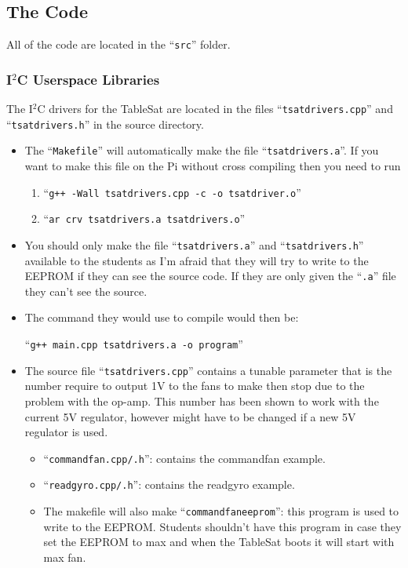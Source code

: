 \documentclass{article}
\begin{document}
\subsection{The Code}
All of the code are located in the ``{\tt src}'' folder.
\subsubsection{I$^2$C Userspace Libraries}
The I$^2$C drivers for the TableSat are located in the files ``{\tt tsat\textunderscore drivers.cpp}'' and ``{\tt tsat\textunderscore drivers.h}'' in the source directory.
\begin{itemize}
    \item The ``{\tt Makefile}'' will automatically make the file ``{\tt tsat\textunderscore drivers.a}''. If you want to make this file on the Pi without cross compiling then you need to run 
    \begin{enumerate}
        \item ``{\tt g++ -Wall tsat\textunderscore drivers.cpp -c -o tsat\textunderscore driver.o}''
        \item ``{\tt ar crv tsat\textunderscore drivers.a tsat\textunderscore drivers.o}''
    \end{enumerate}
    \item You should only make the file ``{\tt tsat\textunderscore drivers.a}'' and ``{\tt tsat\textunderscore drivers.h}'' available to the students as I'm afraid that they will try to write to the EEPROM if they can see the source code. If they are only given the ``{\tt .a}'' file they can't see the source.
    \item The command they would use to compile would then be:

    ``{\tt g++ main.cpp tsat\textunderscore drivers.a -o program}''
    \item The source file ``{\tt tsat\textunderscore drivers.cpp}'' contains a tunable parameter that is the number require to output 1V to the fans to make then stop due to the problem with the op-amp. This number has been shown to work with the current 5V regulator, however might have to be changed if a new 5V regulator is used.

    \begin{itemize}
        \item ``{\tt command\textunderscore fan.cpp/.h}'': contains the command\textunderscore fan example.
        \item ``{\tt read\textunderscore gyro.cpp/.h}'': contains the read\textunderscore gyro example.
        \item The makefile will also make ``{\tt command\textunderscore fan\textunderscore eeprom}'': this program is used to write to the EEPROM. Students shouldn't have this program in case they set the EEPROM to max and when the TableSat boots it will start with max fan.
    \end{itemize}
\end{itemize}
\end{document}
